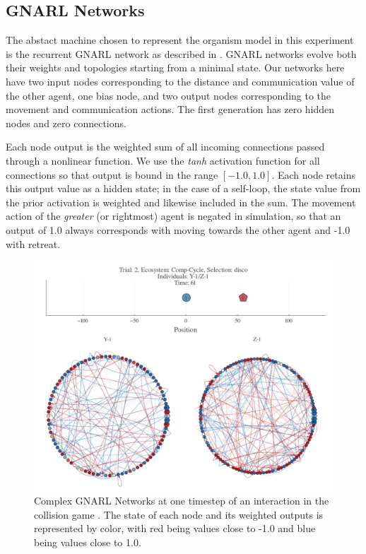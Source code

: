 \documentclass{article}
\begin{document}
\subsection*{GNARL Networks}
The abstact machine chosen to represent the organism model in this experiment is the recurrent GNARL
network as described in \cite{angeline1994}. GNARL networks evolve both their weights and 
topologies starting from a minimal state. Our networks here have two input nodes corresponding 
to the distance and communication value of the other agent, one bias node, and two output nodes 
corresponding to the movement and communication actions. The first generation has zero hidden 
nodes and zero connections.

Each node output is the weighted sum of all incoming connections passed through a nonlinear 
function. We use the \textit{tanh} activation function for all connections so that output is 
bound in the range $[-1.0, 1.0]$. Each node retains this output value as a hidden state; in the 
case of a self-loop, the state value from the prior activation is weighted and likewise included 
in the sum. The movement action of the \textit{greater} (or rightmost) agent is negated in simulation, 
so that an output of 1.0 always corresponds with moving towards the other agent and -1.0 with retreat. 

\begin{figure}[H]
    \begin{center}
        \includegraphics[width=4.5in]{gnarl.png}
        \caption{Complex GNARL Networks at one timestep of an interaction in the collision game
        \citep{willkens2022}. The state of each node and its weighted outputs is represented by 
        color, with red being values close to -1.0 and blue being values close to 1.0.}
        \label{gnarl}
    \end{center}
\end{figure}
\end{document}
